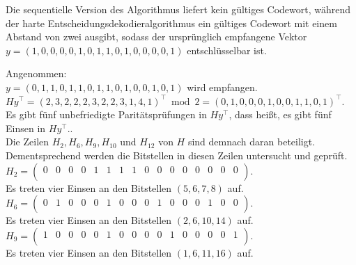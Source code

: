 \begin{Beispiel}
    Die sequentielle Version des Algorithmus liefert kein gültiges Codewort, 
    während der harte Entscheidungsdekodieralgorithmus ein gültiges Codewort mit einem Abstand von zwei ausgibt, 
    sodass der ursprünglich empfangene Vektor $y = (1,0,0,0,0,1,0,1,1,0,1,0,0,0,0,1)$ entschlüsselbar ist.\\
    
\end{Beispiel}

\begin{Beispiel}
    Angenommen:\\

    $y = (0,1,1,0,1,1,0,1,1,0,1,0,0,1,0,1)$ wird empfangen.\\
    
    $Hy^\intercal= (2,3,2,2,2,3,2,2,3,1,4,1)^\intercal \bmod 2= (0,1,0,0,0,1,0,0,1,1,0,1)^\intercal.$\\
    
    Es gibt fünf unbefriedigte Paritätsprüfungen in $Hy^\intercal$, dass hei\ss{}t, es gibt fünf Einsen in $Hy^\intercal.$.\\
    Die Zeilen $H_2, H_6, H_9, H_{10}$ und $H_{12}$ von $H$ sind demnach daran beteiligt.\\ 
    Dementsprechend werden die Bitstellen in diesen Zeilen untersucht und geprüft.\\
    
    $H_2= \left( \begin{array}{rrrrrrrrrrrrrrrr}
        0 & 0 & 0 & 0 & 1 & 1 & 1 & 1 & 0 & 0 & 0 & 0 & 0 & 0 & 0 & 0 \\
       \end{array}\right). 
    $\\
    Es treten vier Einsen an den Bitstellen $(5, 6, 7, 8)$ auf.\\
    
    $H_6= \left( \begin{array}{rrrrrrrrrrrrrrrr}
        0 & 1 & 0 & 0 & 0 & 1 & 0 & 0 & 0 & 1 & 0 & 0 & 0 & 1 & 0 & 0 \\
       \end{array}\right). 
    $\\
    Es treten vier Einsen an den Bitstellen $(2, 6, 10, 14)$ auf.\\
    
    $H_9= \left( \begin{array}{rrrrrrrrrrrrrrrr}
        1 & 0 & 0 & 0 & 0 & 1 & 0 & 0 & 0 & 0 & 1 & 0 & 0 & 0 & 0 & 1 \\
       \end{array}\right). 
    $\\
    Es treten vier Einsen an den Bitstellen $(1, 6, 11, 16)$ auf.\\
    

\end{Beispiel}
